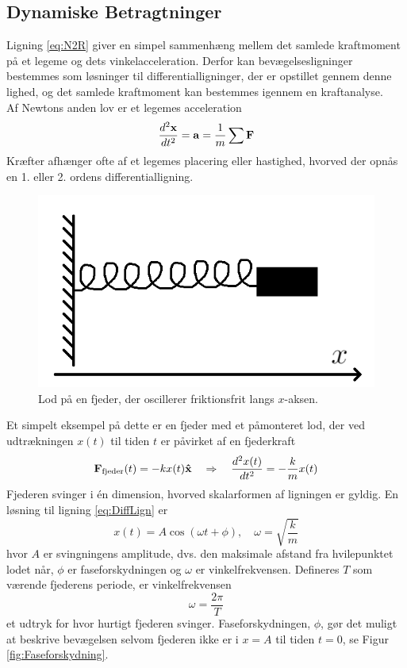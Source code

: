 \subsection{Dynamiske Betragtninger}
Ligning \ref{eq:N2R} giver en simpel sammenhæng mellem det samlede kraftmoment på et legeme og dets vinkelacceleration. Derfor kan bevægelsesligninger bestemmes som løsninger til differentialligninger, der er opstillet gennem denne lighed, og det samlede kraftmoment kan bestemmes igennem en kraftanalyse. \\
Af Newtons anden lov er et legemes acceleration
\begin{equation}
    {d^2{\ensuremath{\mathbf{x}}} \over d{t}^2} = \mathbf{a} = \frac{1}{m}\sum\mathbf{F}
\end{equation}
Kræfter afhænger ofte af et legemes placering eller hastighed, hvorved der opnås en 1. eller 2. ordens differentialligning. \\
\begin{figure}[h!]
\centering
\includegraphics[width=.6\textwidth]{RotationelMekanik/Fjeder}
\caption{Lod på en fjeder, der oscillerer friktionsfrit langs $x$-aksen.}
\label{fig:Fjeder}
\end{figure}

Et simpelt eksempel på dette er en fjeder med et påmonteret lod, der ved udtrækningen $x(t)$ til tiden $t$ er påvirket af en fjederkraft
\begin{equation} \label{eq:DiffLign}
    \mathbf{F}_\text{fjeder}(t) = -kx(t)\mathbf{\hat{x}} \quad\Rightarrow\quad {d^2{x(t)} \over d{t}^2} = -\frac{k}{m}x(t)
\end{equation}
Fjederen svinger i én dimension, hvorved skalarformen af ligningen er gyldig. En løsning til ligning \ref{eq:DiffLign} er
\begin{equation}
    x(t) = A\cos\left(\omega t + \phi\right), \quad \omega = \sqrt{\frac{k}{m}}
\end{equation}
hvor $A$ er svingningens amplitude, dvs. den maksimale afstand fra hvilepunktet lodet når, $\phi$ er faseforskydningen og $\omega$ er vinkelfrekvensen. Defineres $T$ som værende fjederens periode, er vinkelfrekvensen
\begin{equation}
\omega = \frac{2\pi}{T}
\end{equation}
et udtryk for hvor hurtigt fjederen svinger. Faseforskydningen, $\phi$, gør det muligt at beskrive bevægelsen selvom fjederen ikke er i $x=A$ til tiden $t=0$, se Figur \ref{fig:Faseforskydning}.

